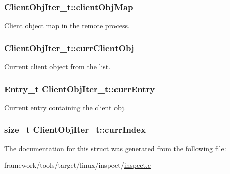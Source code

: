 \subsubsection[{\texorpdfstring{client\+Obj\+Map}{clientObjMap}}]{ Client\+Obj\+Iter\+\_\+t\+::client\+Obj\+Map}\hypertarget{struct_client_obj_iter__t_af2d4d3810f8c40d694fc4732f34d6d7a}{}\label{struct_client_obj_iter__t_af2d4d3810f8c40d694fc4732f34d6d7a}


Client object map in the remote process. 

\subsubsection[{\texorpdfstring{curr\+Client\+Obj}{currClientObj}}]{ Client\+Obj\+Iter\+\_\+t\+::curr\+Client\+Obj}\hypertarget{struct_client_obj_iter__t_a1ba3a8464da6cebc18d79f68e6344c90}{}\label{struct_client_obj_iter__t_a1ba3a8464da6cebc18d79f68e6344c90}


Current client object from the list. 

\subsubsection[{\texorpdfstring{curr\+Entry}{currEntry}}]{\setlength{\rightskip}{0pt plus 5cm}Entry\+\_\+t Client\+Obj\+Iter\+\_\+t\+::curr\+Entry}\hypertarget{struct_client_obj_iter__t_a78557bc57c2c92271da77c158c92c000}{}\label{struct_client_obj_iter__t_a78557bc57c2c92271da77c158c92c000}


Current entry containing the client obj. 

\subsubsection[{\texorpdfstring{curr\+Index}{currIndex}}]{\setlength{\rightskip}{0pt plus 5cm}size\+\_\+t Client\+Obj\+Iter\+\_\+t\+::curr\+Index}\hypertarget{struct_client_obj_iter__t_a9c17d7617c9eab63b8be48b9aa729fa9}{}\label{struct_client_obj_iter__t_a9c17d7617c9eab63b8be48b9aa729fa9}


The documentation for this struct was generated from the following file\+:\begin{DoxyCompactItemize}
\item 
framework/tools/target/linux/inspect/\hyperlink{inspect_8c}{inspect.\+c}\end{DoxyCompactItemize}
